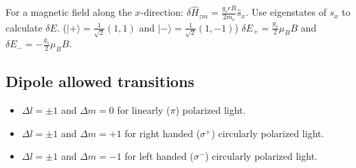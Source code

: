 For a magnetic field along the $x$-direction:
$\delta \hat{H}_{zm} = \frac{g_s e B}{2 m_e} \hat{s}_x$. Use eigenstates of
$\hat{s}_x$ to calculate $\delta E$. ($|+\rangle = \frac{1}{\sqrt{2}} (1,1)$ and
$|-\rangle = \frac{1}{\sqrt{2}} (1,-1)$) $\delta E_+ = \frac{g_s}{2} \mu_B B$ and
$\delta E_- = - \frac{g_s}{2} \mu_B B$.

\subsection{Dipole allowed transitions}
\begin{itemize}
    \item $\Delta l = \pm 1$ and $\Delta m = 0$ for linearly ($\pi$) polarized light.
    \item $\Delta l = \pm 1$ and $\Delta m = +1$ for right handed ($\sigma^+$) circularly polarized light.
    \item $\Delta l = \pm 1$ and $\Delta m = -1$ for left handed ($\sigma^-$) circularly polarized light.
\end{itemize}

